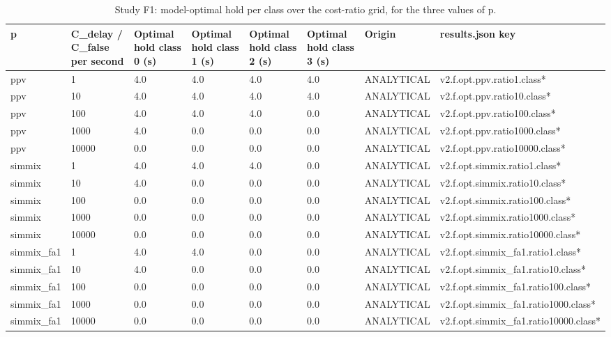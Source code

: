 \begin{table}[t]
\centering
\small
\caption{Study F1: model-optimal hold per class over the cost-ratio grid, for the three values of p.}
\label{tab:v2_tab_hold_cost_grid}
\begin{tabular}{llllllll}
\toprule
p & C\_delay / C\_false per second & Optimal hold class 0 (s) & Optimal hold class 1 (s) & Optimal hold class 2 (s) & Optimal hold class 3 (s) & Origin & results.json key \\
\midrule
ppv & 1 & 4.0 & 4.0 & 4.0 & 4.0 & ANALYTICAL & v2.f.opt.ppv.ratio1.class* \\
ppv & 10 & 4.0 & 4.0 & 4.0 & 4.0 & ANALYTICAL & v2.f.opt.ppv.ratio10.class* \\
ppv & 100 & 4.0 & 4.0 & 4.0 & 0.0 & ANALYTICAL & v2.f.opt.ppv.ratio100.class* \\
ppv & 1000 & 4.0 & 0.0 & 0.0 & 0.0 & ANALYTICAL & v2.f.opt.ppv.ratio1000.class* \\
ppv & 10000 & 0.0 & 0.0 & 0.0 & 0.0 & ANALYTICAL & v2.f.opt.ppv.ratio10000.class* \\
simmix & 1 & 4.0 & 4.0 & 4.0 & 0.0 & ANALYTICAL & v2.f.opt.simmix.ratio1.class* \\
simmix & 10 & 4.0 & 0.0 & 0.0 & 0.0 & ANALYTICAL & v2.f.opt.simmix.ratio10.class* \\
simmix & 100 & 0.0 & 0.0 & 0.0 & 0.0 & ANALYTICAL & v2.f.opt.simmix.ratio100.class* \\
simmix & 1000 & 0.0 & 0.0 & 0.0 & 0.0 & ANALYTICAL & v2.f.opt.simmix.ratio1000.class* \\
simmix & 10000 & 0.0 & 0.0 & 0.0 & 0.0 & ANALYTICAL & v2.f.opt.simmix.ratio10000.class* \\
simmix\_fa1 & 1 & 4.0 & 4.0 & 0.0 & 0.0 & ANALYTICAL & v2.f.opt.simmix\_fa1.ratio1.class* \\
simmix\_fa1 & 10 & 4.0 & 0.0 & 0.0 & 0.0 & ANALYTICAL & v2.f.opt.simmix\_fa1.ratio10.class* \\
simmix\_fa1 & 100 & 0.0 & 0.0 & 0.0 & 0.0 & ANALYTICAL & v2.f.opt.simmix\_fa1.ratio100.class* \\
simmix\_fa1 & 1000 & 0.0 & 0.0 & 0.0 & 0.0 & ANALYTICAL & v2.f.opt.simmix\_fa1.ratio1000.class* \\
simmix\_fa1 & 10000 & 0.0 & 0.0 & 0.0 & 0.0 & ANALYTICAL & v2.f.opt.simmix\_fa1.ratio10000.class* \\
\bottomrule
\end{tabular}
\end{table}
